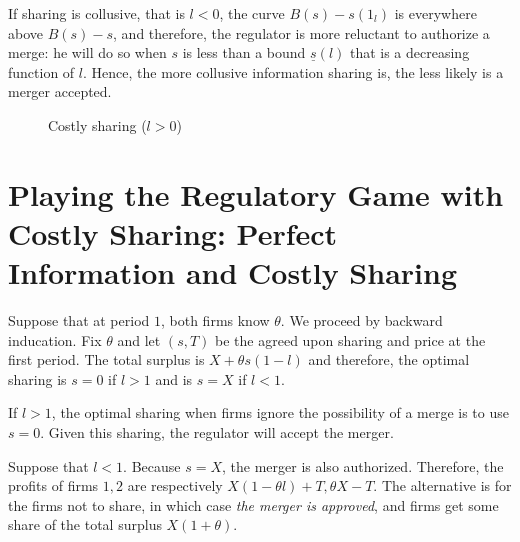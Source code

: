 \documentclass[a4paper]{article}
\renewcommand{\t}{\theta}
\begin{document}
If sharing is collusive, that is $l<0$, the curve $B(s)-s(1_l)$ is everywhere above $B(s)-s$, and therefore, the regulator is more reluctant to authorize a merge: he will do so when $s$ is less than a bound $\underline s(l)$ that is a decreasing function of $l$. Hence, the more collusive information sharing is, the less likely is a merger accepted.

\begin{figure}[h!]
    \centering
    \caption{Costly sharing ($l>0$)}
    \label{fig:l>0}
\end{figure}


\section{Playing the Regulatory Game with Costly Sharing: Perfect Information and Costly Sharing}
Suppose that at period $1$, both firms know $\theta$. We proceed by backward inducation. Fix $\t$ and let $(s,T)$ be the agreed upon sharing and price at the first period. The total surplus is $X+\t s(1-l)$ and therefore, the optimal sharing is $s=0$ if $l> 1$ and is $s=X$ if $l<1$. 

If $l>1$, the optimal sharing when firms ignore the possibility of a merge is to use $s=0$. Given this sharing, the regulator will accept the merger.  

Suppose that $l<1$. Because $s=X$, the merger is also authorized. Therefore, the profits of firms $1,2$ are respectively $X(1-\t l)+T,\t X -T$. The alternative is for the firms not to share, in which case \emph{the merger is approved}, and firms get some share of the total surplus $X(1+\t)$. 




\end{document}
